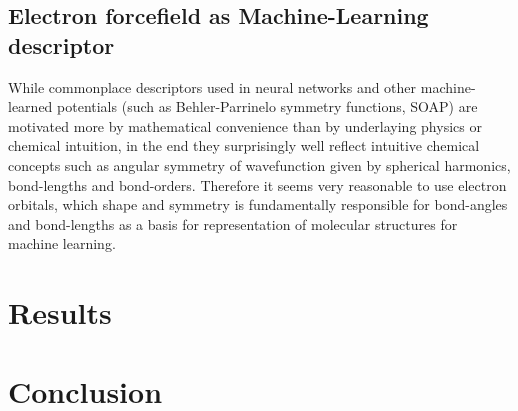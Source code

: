 \documentclass[%
 reprint,
 amsmath,amssymb,
prb,
]{revtex4-1}
\begin{document}
\subsection{Electron forcefield as Machine-Learning descriptor}

While commonplace descriptors used in neural networks and other machine-learned potentials (such as Behler-Parrinelo symmetry functions, SOAP) are motivated more by mathematical convenience than by underlaying physics or chemical intuition, in the end they surprisingly well reflect intuitive chemical concepts such as angular symmetry of wavefunction given by spherical harmonics, bond-lengths and bond-orders. Therefore it seems very reasonable to use electron orbitals, which shape and symmetry is fundamentally responsible for bond-angles and bond-lengths as a basis for representation of molecular structures for machine learning.     


\section{Results}



\section{Conclusion}
\end{document}
